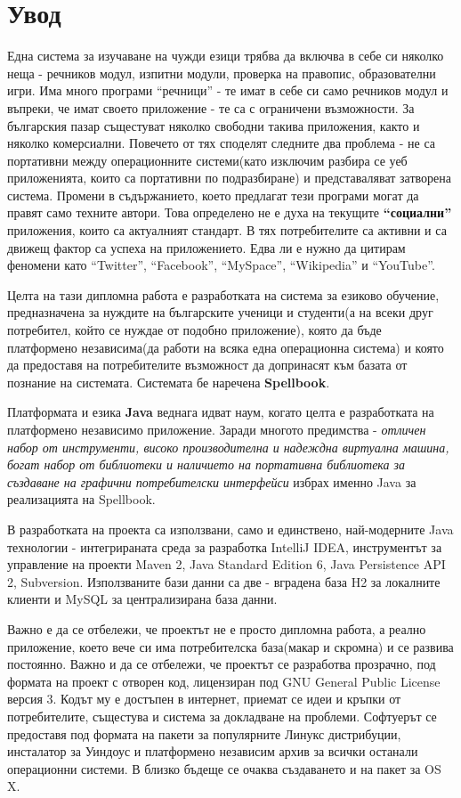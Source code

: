 \chapter*{Увод}
Една система за изучаване на чужди езици трябва да включва в себе си
няколко неща - речников модул, изпитни модули, проверка на правопис,
образователни игри. Има много програми "`речници"' - те имат в себе си
само речников модул и въпреки, че имат своето приложение - те са с
ограничени възможности. За българския пазар същестуват няколко
свободни такива приложения, както и няколко комерсиални. Повечето от
тях споделят следните два проблема - не са портативни между
операционните системи(като изключим разбира се уеб приложенията, които
са портативни по подразбиране) и представаляват затворена
система. Промени в съдържанието, което предлагат тези програми могат
да правят само техните автори. Това определено не е духа на текущите
\textbf{"`социални"'} приложения, които са актуалният стандарт. В тях
потребителите са активни и са движещ фактор са успеха на
приложението. Едва ли е нужно да цитирам феномени като "`Twitter"',
"`Facebook"', "`MySpace"', "`Wikipedia"' и "`YouTube"'. 

Целта на тази дипломна работа е разработката на система за езиково
обучение, предназначена за нуждите на българските ученици и студенти(а
на всеки друг потребител, който се нуждае от подобно приложение),
която да бъде платформено независима(да работи на всяка една
операционна система) и която да предоставя на потребителите възможност
да допринасят към базата от познание на системата. Системата бе
наречена {\bf Spellbook}.

Платформата и езика \textbf{Java} веднага идват наум, когато целта е
разработката на платформено независимо приложение. Заради многото
предимства - \emph{отличен набор от инструменти, високо производителна и
надеждна виртуална машина, богат набор от библиотеки и наличието на
портативна библиотека за създаване на графични потребителски
интерфейси} избрах именно Java за реализацията на Spellbook.

В разработката на проекта са използвани, само и единствено,
най-модерните Java технологии - интегрираната среда за разработка
IntelliJ IDEA, инструментът за управление на проекти Maven 2, Java
Standard Edition 6, Java Persistence API 2, Subversion. Използваните
бази данни са две - вградена база H2 за локалните клиенти и MySQL за
централизирана база данни.

Важно е да се отбележи, че проектът не е просто дипломна работа, а
реално приложение, което вече си има потребителска база(макар и
скромна) и се развива постоянно. Важно и да се отбележи, че проектът
се разработва прозрачно, под формата на проект с отворен код,
лицензиран под GNU General Public License версия 3. Кодът му е
достъпен в интернет, приемат се идеи и кръпки от потребителите,
същестува и система за докладване на проблеми. Софтуерът се предоставя
под формата на пакети за популярните Линукс дистрибуции, инсталатор за
Уиндоус и платформено независим архив за всички останали операционни
системи. В близко бъдеще се очаква създаването и на пакет за OS X.

